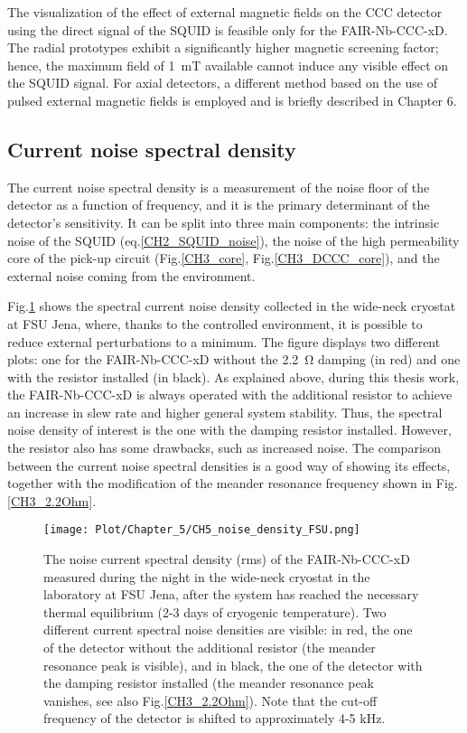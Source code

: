 \documentclass[12pt,a4paper]{report}
\begin{document}
        The visualization of the effect of external magnetic fields on the CCC detector using the direct signal of the SQUID is feasible only for the FAIR-Nb-CCC-xD. The radial prototypes exhibit a significantly higher magnetic screening factor; hence, the maximum field of \SI{1}{\milli\tesla} available cannot induce any visible effect on the SQUID signal. For axial detectors, a different method based on the use of pulsed external magnetic fields is employed and is briefly described in Chapter 6.
        \subsection{Current noise spectral density}
        The current noise spectral density is a measurement of the noise floor of the detector as a function of frequency, and it is the primary determinant of the detector's sensitivity. It can be split into three main components: the intrinsic noise of the SQUID (eq.\ref{CH2_SQUID_noise}), the noise of the high permeability core of the pick-up circuit (Fig.\ref{CH3_core}, Fig.\ref{CH3_DCCC_core}), and the external noise coming from the environment. 
        
        Fig.\ref{CH5_noise_jena} shows the spectral current noise density collected in the wide-neck cryostat at FSU Jena, where, thanks to the controlled environment, it is possible to reduce external perturbations to a minimum. The figure displays two different plots: one for the FAIR-Nb-CCC-xD without the \SI{2.2}{\ohm} damping (in red) and one with the resistor installed (in black). As explained above, during this thesis work, the FAIR-Nb-CCC-xD is always operated with the additional resistor to achieve an increase in slew rate and higher general system stability. Thus, the spectral noise density of interest is the one with the damping resistor installed. However, the resistor also has some drawbacks, such as increased noise. The comparison between the current noise spectral densities is a good way of showing its effects, together with the modification of the meander resonance frequency shown in Fig.\ref{CH3_2.2Ohm}.
        
        \begin{figure}[H]
        	\centering
        	\texttt{[image: Plot/Chapter\_5/CH5\_noise\_density\_FSU.png]}
        	\caption{\small{The noise current spectral density (rms) of the FAIR-Nb-CCC-xD measured during the night in the wide-neck cryostat in the laboratory at FSU Jena, after the system has reached the necessary thermal equilibrium (2-3 days of cryogenic temperature). Two different current spectral noise densities are visible: in red, the one of the detector without the additional resistor (the meander resonance peak is visible), and in black, the one of the detector with the damping resistor installed (the meander resonance peak vanishes, see also Fig.\ref{CH3_2.2Ohm}). Note that the cut-off frequency of the detector is shifted to approximately 4-5 kHz.}}
        	\label{CH5_noise_jena}
        \end{figure}
        
\end{document}
